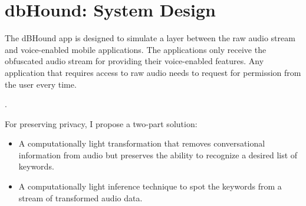 
\section{dbHound: System Design}
\label{sec:system_design}

The dBHound app is designed to simulate a layer between the raw audio stream and voice-enabled mobile applications.
 The applications only receive the obfuscated audio stream for providing their voice-enabled features.
 Any application that requires access to raw audio needs to request for permission from the user every time.

.

For preserving privacy, I propose a two-part solution:
\begin{itemize}
\item A computationally light transformation that removes conversational information from audio but preserves the ability to recognize a desired list of keywords.
\item A computationally light inference technique to spot the keywords from a stream of transformed audio data.
\end{itemize}



